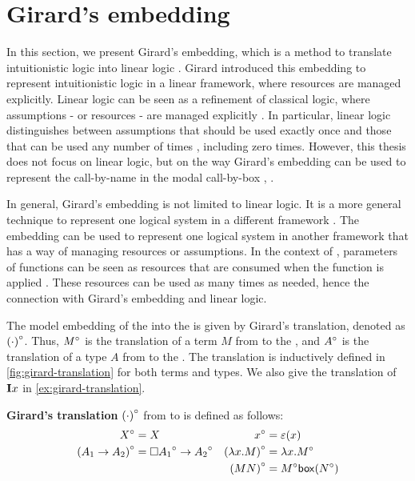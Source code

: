 \section{Girard's embedding}
In this section, we present Girard's embedding, which is a method to translate intuitionistic logic into linear logic \cite{GIRARD19871}.
Girard introduced this embedding to represent intuitionistic logic in a linear framework, where resources are managed explicitly.
Linear logic can be seen as a refinement of classical logic, where assumptions - or resources - are managed explicitly \cite{Troelstra1992}.
In particular, linear logic distinguishes between assumptions that should be used exactly once and those that can be used any number of times \cite{Troelstra1992}, including zero times.
However, this thesis does not focus on linear logic, but on the way Girard's embedding can be used to represent the call-by-name \lc in the modal call-by-box \lc, \lab.

In general, Girard's embedding is not limited to linear logic. It is a more general technique to represent one logical system in a different framework \cite{TroelstraVanDalen1988}.
The embedding can be used to represent one logical system in another framework that has a way of managing resources or assumptions.
In the context of \lan, parameters of functions can be seen as resources that are consumed when the function is applied \cite{MARAIST1999175}.
These resources can be used as many times as needed, hence the connection with Girard's embedding and linear logic.

\label{sec:name-embedding}

The model embedding of the \lan into the \lab is given by Girard's translation, denoted as ${(\cdot)}^\circ$.
Thus, ${M}^\circ$ is the translation of a term $M$ from \lan to the \lab, and ${A}^\circ$ is the translation of a type $A$ from \lan to the \lab.
The translation is inductively defined in \cref{fig:girard-translation} for both terms and types.
We also give the translation of \lterm $\mathbf{I} x$ in \cref{ex:girard-translation}.

\begin{definition}
  \label{fig:girard-translation}
  \textbf{Girard's translation} ${(\cdot)}^\circ$ from \lan to \lab is defined as follows:
  \begin{align*}
 {X}^\circ                 & = X                                          & {x}^\circ             & = \varepsilon(x) \\
 {(A_1 \to A_2)}^\circ     & = \square{{A_1}^\circ} \to {A_2}^\circ       & {(\lambda {x}.{M})}^\circ & = \lambda {x}.{{M}^\circ} \\
                               &                                              & {(M N)}^\circ         & = {M}^\circ \mathsf{box}({{N}^\circ})
  \end{align*}
\end{definition}

